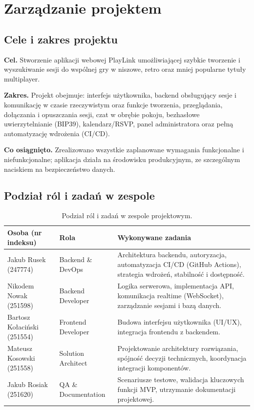 \section{Zarządzanie projektem}
\label{sec:zarz}

\subsection{Cele i zakres projektu}

\textbf{Cel.} Stworzenie aplikacji webowej PlayLink umożliwiającej szybkie tworzenie i
wyszukiwanie sesji do wspólnej gry w niszowe, retro oraz mniej popularne tytuły
multiplayer.

\textbf{Zakres.} Projekt obejmuje: interfejs użytkownika, backend obsługujący sesje i
komunikację w czasie rzeczywistym oraz funkcje tworzenia, przeglądania, dołączania i
opuszczania sesji, czat w obrębie pokoju, bezhasłowe uwierzytelnianie (BIP39),
kalendarz/RSVP, panel administratora oraz pełną automatyzację wdrożenia (CI/CD).

\textbf{Co osiągnięto.} Zrealizowano wszystkie zaplanowane wymagania funkcjonalne i
niefunkcjonalne; aplikacja działa na środowisku produkcyjnym, ze szczególnym
naciskiem na bezpieczeństwo danych.

\subsection{Podział ról i zadań w zespole}

\renewcommand{\arraystretch}{1.3}
\begin{table}[H]
\centering\small
\begin{tabularx}{\textwidth}{@{}llY@{}}
\toprule
\textbf{Osoba (nr indeksu)} & \textbf{Rola} & \textbf{Wykonywane zadania} \\
\midrule
Jakub Rusek (247774) & Backend \& DevOps & Architektura backendu, autoryzacja, automatyzacja CI/CD (GitHub Actions), strategia wdrożeń, stabilność i dostępność. \\
Nikodem Nowak (251598) & Backend Developer & Logika serwerowa, implementacja API, komunikacja realtime (WebSocket), zarządzanie sesjami i bazą danych. \\
Bartosz Kołaciński (251554) & Frontend Developer & Budowa interfejsu użytkownika (UI/UX), integracja frontendu z backendem. \\
Mateusz Kosowski (251558) & Solution Architect & Projektowanie architektury rozwiązania, spójność decyzji technicznych, koordynacja integracji komponentów. \\
Jakub Rosiak (251620) & QA \& Documentation & Scenariusze testowe, walidacja kluczowych funkcji MVP, utrzymanie dokumentacji projektowej. \\
\bottomrule
\end{tabularx}
\caption{Podział ról i zadań w zespole projektowym.}
\label{tab:role}
\end{table}

